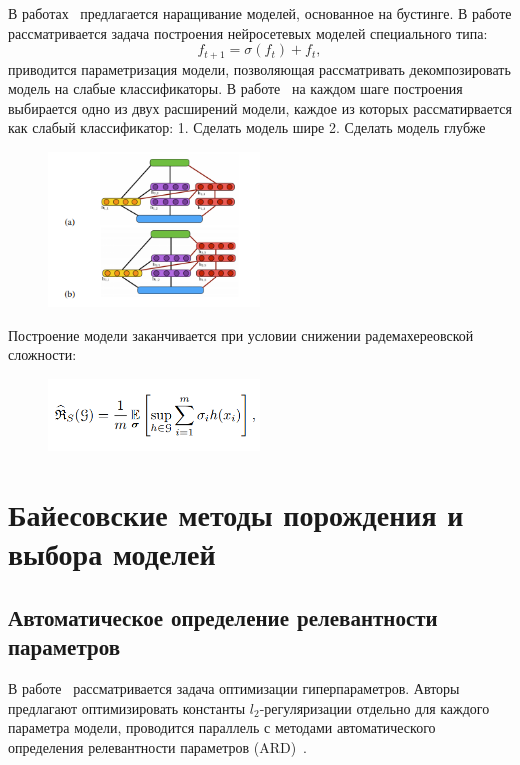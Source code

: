 \documentclass{article}
\begin{document}
В работах~\cite{boost_res, adanet} предлагается наращивание моделей, основанное на бустинге. В работе рассматривается задача построения нейросетевых моделей специального типа:
\[
    f_{t+1} = \sigma(f_t) + f_t,
\]
приводится параметризация модели, позволяющая рассматривать декомпозировать модель на слабые классификаторы.
В работе~\cite{adanet} на каждом шаге построения выбирается одно из двух расширений модели, каждое из которых рассматирвается как слабый классификатор:
1. Сделать модель шире
2. Сделать модель глубже
\begin{figure}[H]
\includegraphics[width=0.5\textwidth]{./arch_review_figs/adanet.png}
\end{figure}
Построение модели заканчивается при условии снижении радемахереовской сложности:
\begin{figure}[H]
\includegraphics[width=0.5\textwidth]{./arch_review_figs/rad.png}
\end{figure}



\section{Байесовские методы порождения и выбора моделей}
\subsection{Автоматическое определение релевантности параметров}
В работе~\cite{hyper} рассматривается задача оптимизации гиперпараметров.  Авторы предлагают оптимизировать константы $l_2$-регуляризации отдельно для каждого параметра модели, проводится параллель с методами автоматического определения релевантности параметров (ARD)~\cite{MacKay}.
\end{document}
